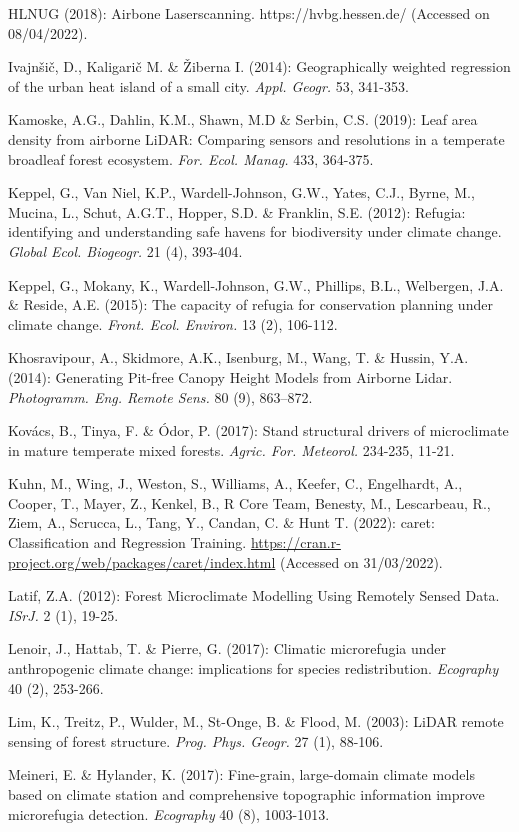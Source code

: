 \documentclass[5p]{elsarticle} %
\newlength{\cslhangindent}
\newlength{\cslentryspacingunit} %
\newenvironment{CSLReferences}[2] %
 {%
  \setlength{\parindent}{0pt}
  \ifodd #1
  \let\oldpar\par
  \def\par{\hangindent=\cslhangindent\oldpar}
  \fi
  \setlength{\parskip}{#2\cslentryspacingunit}
 }%
 {}
\begin{document}
\begin{CSLReferences}{1}{0}
HLNUG (2018): Airbone Laserscanning. https://hvbg.hessen.de/ (Accessed on 08/04/2022).

Ivajnšič, D., Kaligarič M. \& Žiberna I. (2014): Geographically weighted regression of the urban heat island of a small city. \emph{Appl. Geogr.} 53, 341-353. 

Kamoske, A.G., Dahlin, K.M., Shawn, M.D \& Serbin, C.S. (2019): Leaf area density from airborne LiDAR: Comparing sensors and resolutions in a temperate broadleaf forest ecosystem. \emph{For. Ecol. Manag.} 433, 364-375.

Keppel, G., Van Niel, K.P., Wardell-Johnson, G.W., Yates, C.J., Byrne, M., Mucina, L., Schut, A.G.T., Hopper, S.D. \& Franklin, S.E. (2012): Refugia: identifying and understanding safe havens for biodiversity under climate change. \emph{Global Ecol. Biogeogr.} 21 (4), 393-404.

Keppel, G., Mokany, K., Wardell-Johnson, G.W., Phillips, B.L., Welbergen, J.A. \& Reside, A.E. (2015): The capacity of refugia for conservation planning under climate change. \emph{Front. Ecol. Environ.} 13 (2), 106-112.

Khosravipour, A., Skidmore, A.K., Isenburg, M., Wang, T. \& Hussin, Y.A. (2014): Generating Pit-free Canopy Height Models from Airborne Lidar. \emph{Photogramm. Eng. Remote Sens.} 80 (9), 863–872.

Kovács, B., Tinya, F. \& Ódor, P. (2017): Stand structural drivers of microclimate in mature temperate mixed forests. \emph{Agric. For. Meteorol.} 234-235, 11-21.

Kuhn, M., Wing, J., Weston, S., Williams, A., Keefer, C., Engelhardt, A., Cooper, T., Mayer, Z., Kenkel, B., R Core Team, Benesty, M., Lescarbeau, R., Ziem, A., Scrucca, L., Tang, Y., Candan, C. \& Hunt T. (2022):  caret: Classification and Regression Training. \url{https://cran.r-project.org/web/packages/caret/index.html} (Accessed on 31/03/2022).
 
Latif, Z.A. (2012): Forest Microclimate Modelling Using Remotely Sensed Data. \emph{ISrJ.} 2 (1), 19-25.

Lenoir, J., Hattab, T. \& Pierre, G. (2017): Climatic microrefugia under anthropogenic climate change: implications for species redistribution. \emph{Ecography} 40 (2), 253-266.

Lim, K., Treitz, P., Wulder, M., St-Onge, B. \& Flood, M. (2003): LiDAR remote sensing of forest structure. \emph{Prog. Phys. Geogr.} 27 (1), 88-106.

Meineri, E. \& Hylander, K. (2017): Fine-grain, large-domain climate models based on climate station and comprehensive topographic information improve microrefugia detection. \emph{Ecography} 40 (8), 1003-1013.


\end{CSLReferences}
\end{document}
